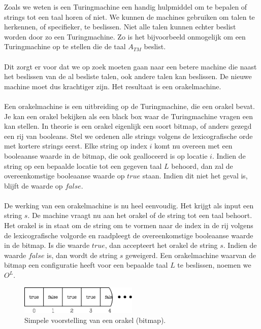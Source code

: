 Zoals we weten is een Turingmachine een handig hulpmiddel om te bepalen of strings tot een taal horen of niet. We kunnen de machines gebruiken om talen te herkennen, of specifieker, te beslissen. Niet alle talen kunnen echter beslist worden door zo een Turingmachine. Zo is het bijvoorbeeld onmogelijk om een Turingmachine op te stellen die de taal $A_{TM}$ beslist.
\\\\
Dit zorgt er voor dat we op zoek moeten gaan naar een betere machine die naast het beslissen van de al besliste talen, ook andere talen kan beslissen. De nieuwe machine moet dus krachtiger zijn. Het resultaat is een orakelmachine.
\\\\
Een orakelmachine is een uitbreiding op de Turingmachine, die een orakel bevat. Je kan een orakel bekijken als een black box waar de Turingmachine vragen een kan stellen. In theorie is een orakel eigenlijk een soort bitmap, of anders gezegd een rij van booleans. Stel we ordenen alle strings volgens de lexicografische orde met kortere strings eerst. Elke string op index $i$ komt nu overeen met een booleaanse waarde in de bitmap, die ook gealloceerd is op locatie $i$. Indien de string op een bepaalde locatie tot een gegeven taal $L$ behoord, dan zal de overeenkomstige booleaanse waarde op $true$ staan. Indien dit niet het geval is, blijft de waarde op $false$.
\\\\
De werking van een orakelmachine is nu heel eenvoudig. Het krijgt als input een string $s$. De machine vraagt nu aan het orakel of de string tot een taal behoort. Het orakel is in staat om de string om te vormen naar de index in de rij volgens de lexicografische volgorde en raadpleegt de overeenkomstige booleaanse waarde in de bitmap. Is die waarde $true$, dan accepteert het orakel de string $s$. Indien de waarde $false$ is, dan wordt de string $s$ geweigerd. Een orakelmachine waarvan de bitmap een configuratie heeft voor een bepaalde taal $L$ te beslissen, noemen we $O^L$.

\vspace{3mm}
\begin{figure}[h!]
  \centering
      \includegraphics[width=0.5\textwidth]{./img/oracle}
  \caption{Simpele voorstelling van een orakel (bitmap).}
\end{figure}
\vspace{3mm}

